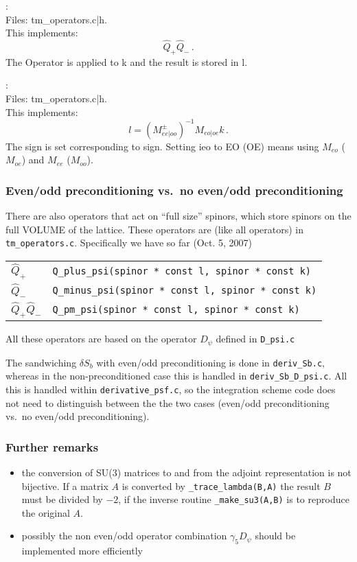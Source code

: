 :\\
Files: {\ttfamily tm\_operators.c|h}.\\
This implements:
\[
\hat Q_{+} \hat Q_{-}\, .
\]
The Operator is applied to {\ttfamily k} and the result is stored in
{\ttfamily l}.

:\\
Files:  {\ttfamily tm\_operators.c|h}.\\
This implements:
\[
l = (M_{ee|oo}^\pm)^{-1} M_{eo|oe} k\, .
\]
The sign is set corresponding to {\ttfamily sign}. Setting {\ttfamily
  ieo} to {\ttfamily EO} ({\ttfamily OE}) means using $M_{eo}$
($M_{oe}$) and $M_{ee}$ ($M_{oo}$).

\subsubsection{Even/odd preconditioning vs.\ no even/odd preconditioning}

There are also operators that act on ``full size'' spinors, which
store spinors on the full VOLUME of the lattice. These operators are
(like all operators) in \texttt{tm\_operators.c}. Specifically we have
so far (Oct. 5, 2007) 
\begin{center}
\begin{tabular}{ll}
$\hat{Q}_+$ & \texttt{Q\_plus\_psi(spinor * const l, spinor * const
  k)}\\ 
$\hat{Q}_-$ & \texttt{Q\_minus\_psi(spinor * const l, spinor * const
  k)}\\ 
$\hat{Q}_+ \hat{Q}_-$ & \texttt{Q\_pm\_psi(spinor * const l, spinor *
  const k)} 
\end{tabular}
\end{center}
All these operators are based on the operator $D_\psi$ defined in
\texttt{D\_psi.c}

The sandwiching $\delta S_b$ with even/odd preconditioning is done in
\texttt{deriv\_Sb.c}, whereas in the non-preconditioned case this is
handled in \texttt{deriv\_Sb\_D\_psi.c}. All this is handled within
\texttt{derivative\_psf.c}, so the integration scheme code does not
need to distinguish between the the two cases (even/odd
preconditioning vs.\ no even/odd preconditioning).

\subsubsection{Further remarks}
\begin{itemize}
\item{}the conversion of SU(3) matrices to and from the adjoint
  representation is not bijective. If a matrix $A$ is converted by
  \texttt{\_trace\_lambda(B,A)} the result $B$ must be divided by
  $-2$, if the inverse routine \texttt{\_make\_su3(A,B)} is to
  reproduce the original $A$.   
\item{}possibly the non even/odd operator combination $\gamma_5
  D_\psi$ should be implemented more efficiently  
\end{itemize}


